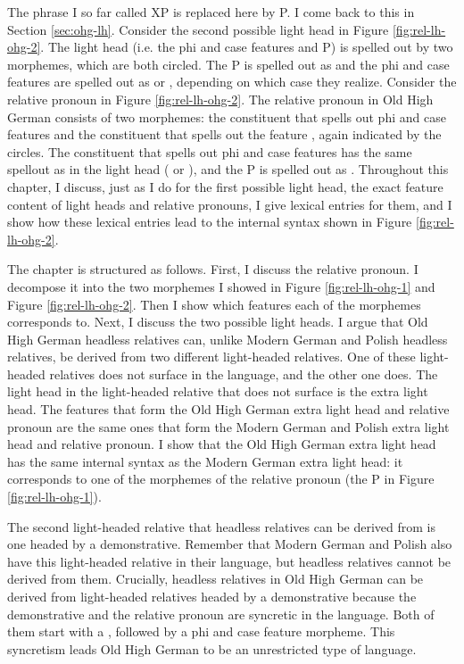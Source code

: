 The phrase I so far called XP is replaced here by P. I come back to this in Section \ref{sec:ohg-lh}.
Consider the second possible light head in Figure \ref{fig:rel-lh-ohg-2}.
The light head (i.e. the phi and case features and P) is spelled out by two morphemes, which are both circled. The P is spelled out as  and the phi and case features are spelled out as  or , depending on which case they realize.
Consider the relative pronoun in Figure \ref{fig:rel-lh-ohg-2}.
The relative pronoun in Old High German consists of two morphemes: the constituent that spells out phi and case features and the constituent that spells out the feature , again indicated by the circles. The constituent that spells out phi and case features has the same spellout as in the light head ( or ), and the P is spelled out as .
Throughout this chapter, I discuss, just as I do for the first possible light head, the exact feature content of light heads and relative pronouns, I give lexical entries for them, and I show how these lexical entries lead to the internal syntax shown in Figure \ref{fig:rel-lh-ohg-2}.

The chapter is structured as follows.
First, I discuss the relative pronoun. I decompose it into the two morphemes I showed in Figure \ref{fig:rel-lh-ohg-1} and Figure \ref{fig:rel-lh-ohg-2}. Then I show which features each of the morphemes corresponds to.
Next, I discuss the two possible light heads. I argue that Old High German headless relatives can, unlike Modern German and Polish headless relatives, be derived from two different light-headed relatives. One of these light-headed relatives does not surface in the language, and the other one does.
The light head in the light-headed relative that does not surface is the extra light head. The features that form the Old High German extra light head and relative pronoun are the same ones that form the Modern German and Polish extra light head and relative pronoun. I show that the Old High German extra light head has the same internal syntax as the Modern German extra light head: it corresponds to one of the morphemes of the relative pronoun (the P in Figure \ref{fig:rel-lh-ohg-1}).

The second light-headed relative that headless relatives can be derived from is one headed by a demonstrative. Remember that Modern German and Polish also have this light-headed relative in their language, but headless relatives cannot be derived from them. Crucially, headless relatives in Old High German can be derived from light-headed relatives headed by a demonstrative because the demonstrative and the relative pronoun are syncretic in the language. Both of them start with a , followed by a phi and case feature morpheme. This syncretism leads Old High German to be an unrestricted type of language.

